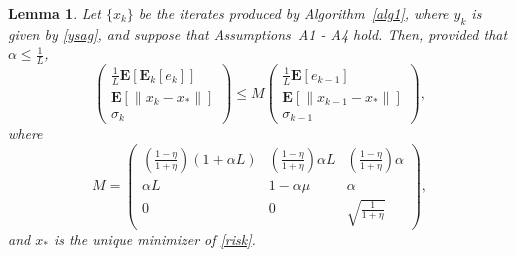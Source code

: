 \documentclass[11pt]{article}
\newtheorem{lem}[thm]{Lemma}
\newcommand{\E}{\mathbf{E}}
\begin{document}
\begin{lem} \label{lemma:main} Let $\{x_k\}$ be the iterates produced by Algorithm~\ref{alg1}, where $y_k$ is given by \eqref{ysag}, and suppose that Assumptions~A1 - A4 hold.  Then, provided that $\alpha \leq \frac{1}{L}$, 
\begin{equation}\label{eq:control}
 \begin{pmatrix} \frac{1}{L}\E[\E_k[e_k]]\\ \E[\|x_k-x_\ast \|] \\ \sigma_k \end{pmatrix} 
\leq M
 \begin{pmatrix} \frac{1}{L}\E[e_{k-1}] \\ \E[\| x_{k-1}-x_\ast \|] \\ \sigma_{k-1} \end{pmatrix} ,
\end{equation}
where
\begin{equation}\label{eq:M}
 M = \begin{pmatrix} (\frac{1-\eta}{1+\eta})(1+\alpha  L)  &    (\frac{1-\eta}{1+\eta})\alpha L & (\frac{1-\eta}{1+\eta}) \alpha \\  
                   \alpha L  & 1-\alpha \mu &  \alpha  \\
                   0 & 0 & \sqrt{ \frac{1}{1+\eta}}  \end{pmatrix},                   
\end{equation}
and $x_\ast$ is the unique minimizer of \eqref{risk}.
\end{lem}
\end{document}
